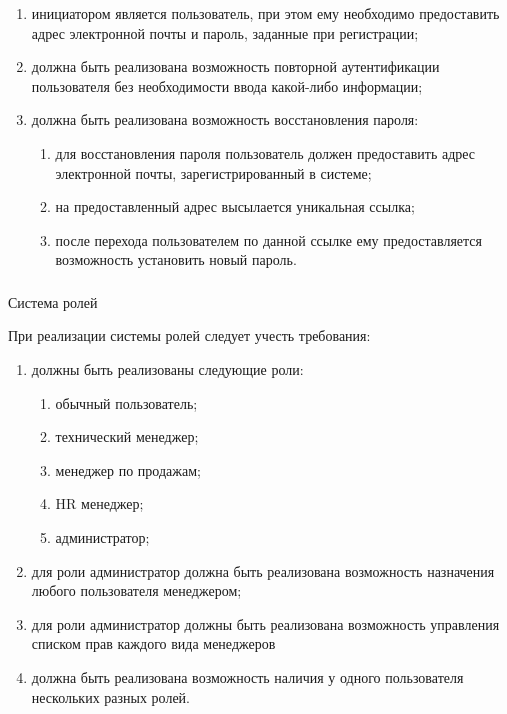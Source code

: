 \begin{enumerate}
  \item инициатором является пользователь, при этом ему необходимо предоставить адрес электронной почты и пароль,
  заданные при регистрации;
  \item должна быть реализована возможность повторной аутентификации пользователя без необходимости ввода
  какой-либо информации;
	\item должна быть реализована возможность восстановления пароля:
	\begin{enumerate}
		\item для восстановления пароля пользователь должен предоставить адрес электронной почты, зарегистрированный в системе;
		\item на предоставленный адрес высылается уникальная ссылка;
		\item после перехода пользователем по данной ссылке ему предоставляется возможность установить новый пароль.
	\end{enumerate}
\end{enumerate}

\subsubsection{} Система ролей
\label{sec:domain:specification:roles}

При реализации системы ролей следует учесть требования:

\begin{enumerate}
	\item должны быть реализованы следующие роли:
	\begin{enumerate}
		\item обычный пользователь;
		\item технический менеджер;
		\item менеджер по продажам;
		\item HR менеджер;
		\item администратор;
	\end{enumerate}
	\item для роли администратор должна быть реализована возможность назначения любого пользователя менеджером;
	\item для роли администратор должны быть реализована возможность \linebreak управления списком прав каждого вида менеджеров
	\item должна быть реализована возможность наличия у одного пользователя нескольких разных ролей.
\end{enumerate}


